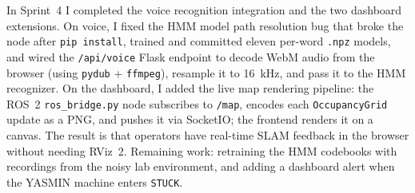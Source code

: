 \documentclass[conference]{IEEEtran}
\begin{document}
In Sprint~4 I completed the voice recognition integration and the two
dashboard extensions. On voice, I fixed the HMM model path resolution
bug that broke the node after \texttt{pip install}, trained and committed
eleven per-word \texttt{.npz} models, and wired the \texttt{/api/voice}
Flask endpoint to decode WebM audio from the browser (using \texttt{pydub}
+ \texttt{ffmpeg}), resample it to 16~kHz, and pass it to the HMM
recognizer. On the dashboard, I added the live map rendering pipeline:
the ROS~2 \texttt{ros\_bridge.py} node subscribes to \texttt{/map},
encodes each \texttt{OccupancyGrid} update as a PNG, and pushes it via
SocketIO; the frontend renders it on a canvas. The result is that
operators have real-time SLAM feedback in the browser without needing
RViz~2. Remaining work: retraining the HMM codebooks with recordings
from the noisy lab environment, and adding a dashboard alert when the
YASMIN machine enters \texttt{STUCK}.
\end{document}
